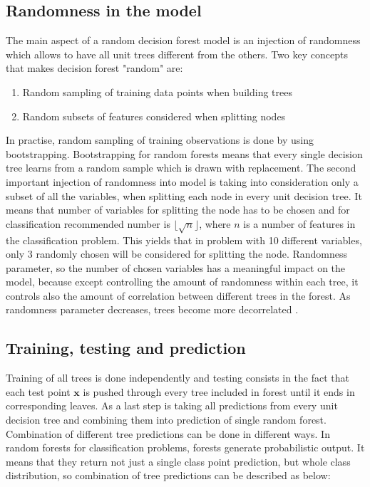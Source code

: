 \subsection{Randomness in the model}
The main aspect of a random decision forest model is an injection of randomness which allows to have all unit trees different from the others. Two key concepts that makes decision forest "random" are:
\begin{enumerate}
	\item Random sampling of training data points when building trees
	\item Random subsets of features considered when splitting nodes
\end{enumerate}
In practise, random sampling of training observations is done by using bootstrapping. 
Bootstrapping for random forests means that every single decision tree learns from a random sample which is drawn with replacement. 
The second important injection of randomness into model is taking into consideration only a subset of all the variables, 
when splitting each node in every unit decision tree. It means that number of variables for splitting the node has to be chosen 
and for classification recommended number is $\lfloor{\sqrt{n}} \rfloor$, 
where $n$ is a number of features in the classification problem. This yields that in problem with 10 different variables, 
only 3 randomly chosen will be considered for splitting the node. Randomness parameter, 
so the number of chosen variables has a meaningful impact on the model, 
because except controlling the amount of randomness within each tree, 
it controls also the amount of correlation between different trees in the forest. 
As randomness parameter decreases, trees become more decorrelated \cite{criminisi2012decision}.

\subsection {Training, testing and prediction}
Training of all trees is done independently and testing consists in the fact that each test point $\textbf{x}$ is pushed 
through every tree included in forest until it ends in corresponding leaves. As a last step is taking all predictions from 
every unit decision tree and combining them into prediction of single random forest. Combination of different tree predictions 
can be done in different ways. In random forests for classification problems, forests generate probabilistic output. 
It means that they return not just a single class point prediction, but whole class distribution, 
so combination of tree predictions can be described as below:

